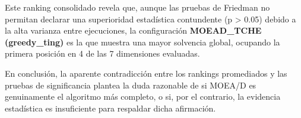 \documentclass[a4paper,10pt]{article}
\begin{document}
Este ranking consolidado revela que, aunque las pruebas de Friedman no permitan declarar una superioridad estadística contundente (p > 0.05) debido a la alta varianza entre ejecuciones, la configuración \textbf{MOEAD\_TCHE (greedy\_ting)} es la que muestra una mayor solvencia global, ocupando la primera posición en 4 de las 7 dimensiones evaluadas.

En conclusión, la aparente contradicción entre los rankings promediados y las pruebas de significancia plantea la duda razonable de si MOEA/D es genuinamente el algoritmo más completo, o si, por el contrario, la evidencia estadística es insuficiente para respaldar dicha afirmación.
\end{document}
